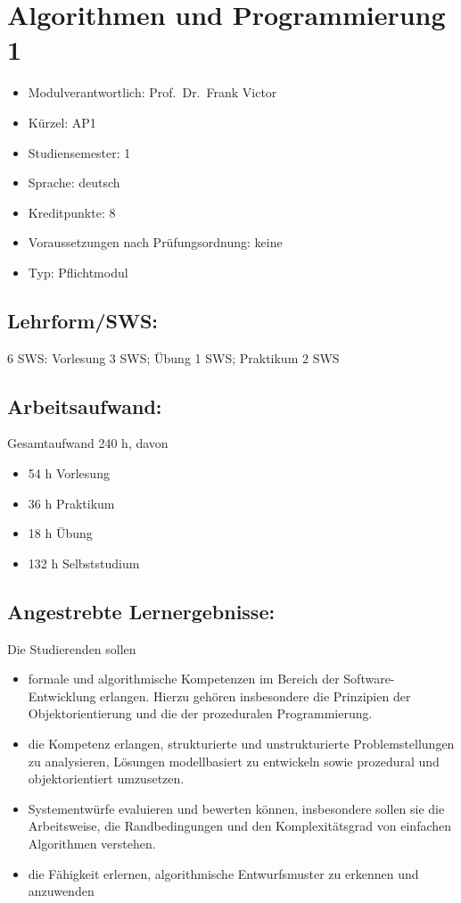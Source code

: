 \chapter{Algorithmen und Programmierung
1}\label{algorithmen-und-programmierung-1}

\begin{itemize}
\tightlist
\item
  Modulverantwortlich: Prof.~Dr.~Frank Victor
\item
  Kürzel: AP1
\item
  Studiensemester: 1
\item
  Sprache: deutsch
\item
  Kreditpunkte: 8
\item
  Voraussetzungen nach Prüfungsordnung: keine
\item
  Typ: Pflichtmodul
\end{itemize}

\section*{Lehrform/SWS:}\label{lehrformsws}

6 SWS: Vorlesung 3 SWS; Übung 1 SWS; Praktikum 2 SWS

\section*{Arbeitsaufwand:}\label{arbeitsaufwand}

Gesamtaufwand 240 h, davon

\begin{itemize}
\tightlist
\item
  54 h Vorlesung
\item
  36 h Praktikum
\item
  18 h Übung
\item
  132 h Selbststudium
\end{itemize}

\section*{Angestrebte
Lernergebnisse:}\label{angestrebte-lernergebnisse}

Die Studierenden sollen

\begin{itemize}
\tightlist
\item
  formale und algorithmische Kompetenzen im Bereich der
  Software-Entwicklung erlangen. Hierzu gehören insbesondere die
  Prinzipien der Objektorientierung und die der prozeduralen
  Programmierung.
\item
  die Kompetenz erlangen, strukturierte und unstrukturierte
  Problemstellungen zu analysieren, Lösungen modellbasiert zu entwickeln
  sowie prozedural und objektorientiert umzusetzen.
\item
  Systementwürfe evaluieren und bewerten können, insbesondere sollen sie
  die Arbeitsweise, die Randbedingungen und den Komplexitätsgrad von
  einfachen Algorithmen verstehen.
\item
  die Fähigkeit erlernen, algorithmische Entwurfsmuster zu erkennen und
  anzuwenden
\end{itemize}

